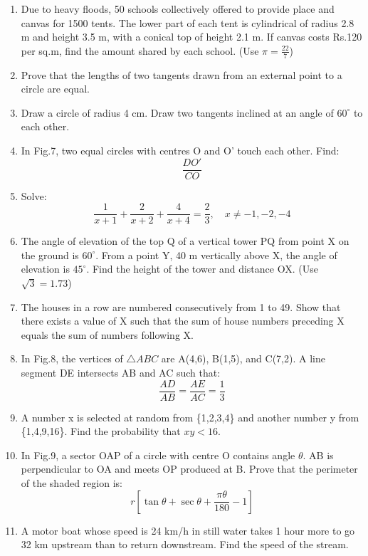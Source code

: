 \documentclass[12pt]{article}
\begin{document}
\begin{enumerate}[label=\arabic*.]
\begin{center}
{\fontsize{14pt}{16pt}\selectfont \textbf{SECTION - D}}\\[0.3cm]
\textbf{Question numbers 21 to 31 carry 4 marks each.}
\end{center}

\item Due to heavy floods, 50 schools collectively offered to provide place and canvas for 1500 tents. The lower part of each tent is cylindrical of radius 2.8 m and height 3.5 m, with a conical top of height 2.1 m. If canvas costs Rs.120 per sq.m, find the amount shared by each school. (Use $\pi=\frac{22}{7}$)

\item Prove that the lengths of two tangents drawn from an external point to a circle are equal.

\item Draw a circle of radius 4 cm. Draw two tangents inclined at an angle of $60^\circ$ to each other.

\item In Fig.7, two equal circles with centres O and O' touch each other. Find:
\[
\frac{DO'}{CO}
\]

\item Solve:
\[
\frac{1}{x+1}+\frac{2}{x+2}+\frac{4}{x+4}=\frac{2}{3}, \quad x\neq -1,-2,-4
\]

\item The angle of elevation of the top Q of a vertical tower PQ from point X on the ground is $60^\circ$. From a point Y, 40 m vertically above X, the angle of elevation is $45^\circ$. Find the height of the tower and distance OX. (Use $\sqrt{3}=1.73$)

\item The houses in a row are numbered consecutively from 1 to 49. Show that there exists a value of X such that the sum of house numbers preceding X equals the sum of numbers following X.

\item In Fig.8, the vertices of $\triangle ABC$ are A(4,6), B(1,5), and C(7,2). A line segment DE intersects AB and AC such that:
\[
\frac{AD}{AB}=\frac{AE}{AC}=\frac{1}{3}
\]

\item A number x is selected at random from \{1,2,3,4\} and another number y from \{1,4,9,16\}. Find the probability that $xy < 16$.

\item In Fig.9, a sector OAP of a circle with centre O contains angle $\theta$. AB is perpendicular to OA and meets OP produced at B. Prove that the perimeter of the shaded region is:
\[
r\left[\tan\theta+\sec\theta+\frac{\pi\theta}{180}-1\right]
\]

\item A motor boat whose speed is 24 km/h in still water takes 1 hour more to go 32 km upstream than to return downstream. Find the speed of the stream.

\end{enumerate}
\end{document}
